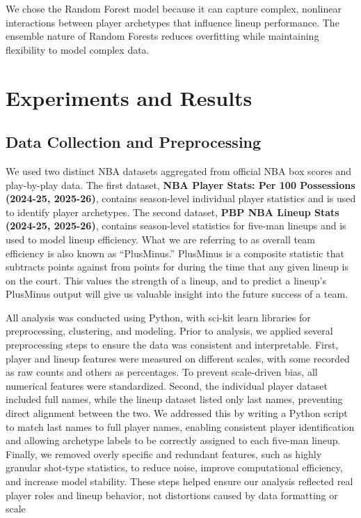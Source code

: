 \documentclass{article}
\begin{document}
We chose the Random Forest model because it can capture complex, nonlinear interactions between player 
archetypes that influence lineup performance. The ensemble nature of Random Forests reduces overfitting while
maintaining flexibility to model complex data.


\section{Experiments and Results}
\label{results}
\subsection{Data Collection and Preprocessing}
We used two distinct NBA datasets aggregated from official NBA box scores and play-by-play data. 
The first dataset, \textbf{NBA Player Stats: Per 100 Possessions (2024-25, 2025-26)}, contains season-level 
individual player statistics and is used to identify player archetypes. The second dataset, \textbf{PBP 
NBA Lineup Stats (2024-25, 2025-26)}, contains season-level statistics for five-man lineups and is 
used to model lineup efficiency. What we are referring to as overall team efficiency is also 
known as “PlusMinus.” PlusMinus is a composite statistic that subtracts points against from points 
for during the time that any given lineup is on the court. This values the strength of a lineup, 
and to predict a lineup's PlusMinus output will give us valuable insight into the future success 
of a team. 

All analysis was conducted using Python, with sci-kit learn libraries for preprocessing, 
clustering, and modeling. Prior to analysis, we applied several preprocessing steps to ensure the 
data was consistent and interpretable. First, player and lineup features were measured on different 
scales, with some recorded as raw counts and others as percentages. To prevent scale-driven bias, 
all numerical features were standardized. Second, the individual player dataset included full names, 
while the lineup dataset listed only last names, preventing direct alignment between the two. 
We addressed this by writing a Python script to match last names to full player names, enabling 
consistent player identification and allowing archetype labels to be correctly assigned to each 
five-man lineup. Finally, we removed overly specific and redundant features, such as highly 
granular shot-type statistics, to reduce noise, improve computational efficiency, and increase 
model stability. These steps helped ensure our analysis reflected real player roles and lineup 
behavior, not distortions caused by data formatting or scale
\end{document}
